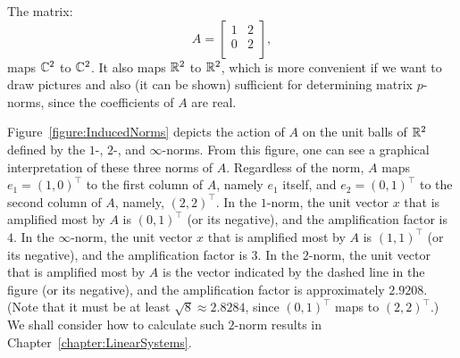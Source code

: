 \begin{example}
The matrix:
\begin{equation}
A = \begin{bmatrix}
1 & 2\\ 0 & 2\\
\end{bmatrix},
\end{equation}
maps $\mathbb{C}^2$ to $\mathbb{C}^2$. It also maps $\mathbb{R}^2$ to $\mathbb{R}^2$, which is more convenient if we want to draw pictures and also (it can be shown) sufficient for determining matrix $p$-norms, since the coefficients of $A$ are real.

Figure~\ref{figure:InducedNorms} depicts the action of $A$ on the unit balls of $\mathbb{R}^2$ defined by the $1$-, $2$-, and $\infty$-norms. From this figure, one can see a graphical interpretation of these three norms of $A$. Regardless of the norm, $A$ maps $e_1 = (1,0)^\top$ to the first column of $A$, namely $e_1$ itself, and $e_2=(0,1)^\top$ to the second column of $A$, namely, $(2,2)^\top$. In the $1$-norm, the unit vector $x$ that is amplified most by $A$ is $(0,1)^\top$ (or its negative), and the amplification factor is $4$. In the $\infty$-norm, the unit vector $x$ that is amplified most by $A$ is $(1,1)^\top$ (or its negative), and the amplification factor is $3$. In the $2$-norm, the unit vector that is amplified most by $A$ is the vector indicated by the dashed line in the figure (or its negative), and the amplification factor is approximately $2.9208$. (Note that it must be at least $\sqrt{8}\approx 2.8284$, since $(0,1)^\top$ maps to $(2,2)^\top$.) We shall consider how to calculate such $2$-norm results in Chapter~\ref{chapter:LinearSystems}.


\end{example}
